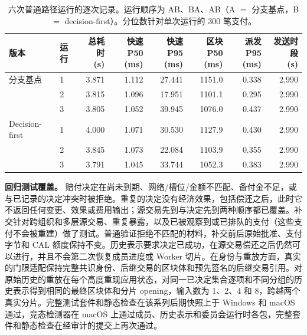 \begin{table}[t]
  \caption{六次普通路径运行的逐次记录。运行顺序为 AB、BA、AB（A $=$ 分支基点，B $=$ decision-first）。分位数针对单次运行的 300 笔支付。}
  \label{tab:supp-cost}
  \centering
  \small
  \setlength{\tabcolsep}{4pt}
  \begin{tabular}{@{}llrrrrrr@{}}
    \toprule
    版本 & 运行 & \shortstack{总耗时\\(s)} & \shortstack{快速 P50\\(ms)} & \shortstack{快速 P95\\(ms)}
      & \shortstack{区块 P50\\(ms)} & \shortstack{派发 P95\\(ms)} & \shortstack{发送时段\\(s)} \\
    \midrule
    分支基点 & 1 & 3.871 & 1.112 & 27.441 & 1151.0 & 0.338 & 2.990 \\
     & 2 & 3.815 & 1.096 & 17.951 & 1101.1 & 0.295 & 2.990 \\
     & 3 & 3.805 & 1.052 & 39.945 & 1076.0 & 0.437 & 2.990 \\
    \addlinespace
    Decision-first & 1 & 4.000 & 1.071 & 30.530 & 1127.9 & 0.430 & 2.990 \\
     & 2 & 3.845 & 1.073 & 22.084 & 1103.9 & 0.355 & 2.990 \\
     & 3 & 3.791 & 1.045 & 33.744 & 1052.3 & 0.383 & 2.990 \\
    \bottomrule
  \end{tabular}
\end{table}

\noindent\textbf{回归测试覆盖。}
赔付决定在尚未到期、网络/槽位/金额不匹配、备付金不足，或与已记录的决定冲突时被拒绝。重复的决定没有经济效果，包括偿还之后，此时它不返回任何变更、效果或费用输出；源交易先到与决定先到两种顺序都已覆盖。补交针对跨组织和多层源交易、重复暴露，以及已被观察到或已排队的支付（这些支付不会被重建）做了测试。普通验证拒绝不匹配的材料，补交前后原始批准、支付字节和 CAL 额度保持不变。历史表示要求决定已成功，在源交易偿还之后仍然可以进行，并且不会第二次恢复成员进度或 Worker 切片。在身份与重放方面，真实的门限适配保持完整共识身份、后继交易的区块体和预先签名的后继交易引用。对原始历史的重放在每个高度重现应用状态，对同一已决定集合逐项和不同分组的历史表示得到相同的最终区块体和分片 opening，输入数为 1、2、4 和 8，跨越两个真实分片。完整测试套件和静态检查在该系列后期快照上于 Windows 和 macOS 通过，竞态检测器在 macOS 上通过成员、历史表示和委员会运行时各包，完整套件和静态检查在经审计的提交上再次通过。

